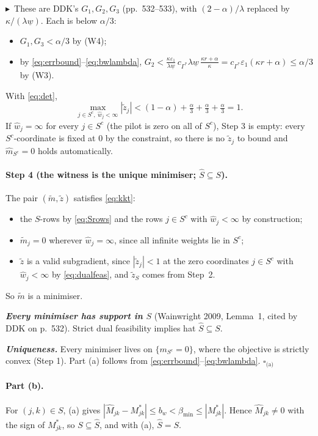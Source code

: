 \documentclass[11pt,a4paper]{article}
\numberwithin{equation}{section}
\theoremstyle{plain}
\theoremstyle{remark}
\newcommand{\changed}{$\blacktriangleright$\ }
\begin{document}
\changed These are DDK's $G_1,G_2,G_3$ (pp.~532--533), with $(2-\alpha)/\lambda$ replaced by $\kappa/(\lambda\underline w)$. Each is below $\alpha/3$:
\begin{itemize}
  \item $G_1,G_3<\alpha/3$ by (W4);
  \item by \eqref{eq:errbound}--\eqref{eq:bwlambda}, $G_2<\frac{\kappa\varepsilon_1}{\lambda\underline w}\,c_{\Gamma^*}\lambda\underline w\,\frac{\kappa r+\alpha}{\kappa}=c_{\Gamma^*}\varepsilon_1(\kappa r+\alpha)\le\alpha/3$ by (W3).
\end{itemize}
With \eqref{eq:det},
\begin{equation}\label{eq:dualfeas}
\max_{j\in S^c,\ \hat w_j<\infty}|\tilde z_j|<(1-\alpha)+\tfrac\alpha3+\tfrac\alpha3+\tfrac\alpha3=1 .
\end{equation}
If $\hat w_j=\infty$ for every $j\in S^c$ (the pilot is zero on all of $S^c$), Step 3 is empty: every $S^c$-coordinate is fixed at $0$ by the constraint, so there is no $\tilde z_j$ to bound and $\hat m_{S^c}=0$ holds automatically.

\paragraph{Step 4 (the witness is the unique minimiser; $\hat S\subseteq S$).} The pair $(\tilde m,\tilde z)$ satisfies \eqref{eq:kkt}:
\begin{itemize}
  \item the $S$-rows by \eqref{eq:Srows} and the rows $j\in S^c$ with $\hat w_j<\infty$ by construction;
  \item $\tilde m_j=0$ wherever $\hat w_j=\infty$, since all infinite weights lie in $S^c$;
  \item $\tilde z$ is a valid subgradient, since $|\tilde z_j|<1$ at the zero coordinates $j\in S^c$ with $\hat w_j<\infty$ by \eqref{eq:dualfeas}, and $\tilde z_S$ comes from Step~2.
\end{itemize}
So $\tilde m$ is a minimiser.

\emph{\textbf{Every minimiser has support in $S$}} (Wainwright 2009, Lemma~1, cited by DDK on p.~532). Strict dual feasibility implies hat $\hat{S} \subseteq S$.

\emph{\textbf{Uniqueness.}} Every minimiser lives on $\{m_{S^c}=0\}$, where the objective is strictly convex (Step 1). Part (a) follows from \eqref{eq:errbound}--\eqref{eq:bwlambda}. \hfill$\square_{\text{(a)}}$

\paragraph{Part (b).} For $(j,k)\in S$, (a) gives $|\hat M_{jk}-M^*_{jk}|\le b_w<\beta_{\min}\le|M^*_{jk}|$. Hence $\hat M_{jk}\ne0$ with the sign of $M^*_{jk}$, so $S\subseteq\hat S$, and with (a), $\hat S=S$. 
\end{document}
